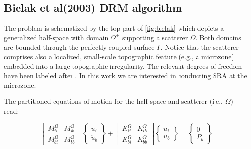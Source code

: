 \documentclass[12pt,letterpaper]{article}
\begin{document}
\subsection*{Bielak et al(2003) DRM algorithm}
The problem is schematized by the top part of \cref{fig:bielak} which depicts a generalized half-space with domain $\Omega^+$ supporting a scatterer $\Omega$. Both domains are bounded through the perfectly coupled surface $\Gamma$. Notice that the scatterer comprises also a localized, small-scale topographic feature (e.g., a microzone) embedded into a large topographic irregularity. The relevant degrees of freedom have been labeled after \cite{bielak2003}. In this work we are interested in conducting SRA at the microzone.


The partitioned equations of motion for the half-space and scatterer (i.e., $\Omega$) read;


\begin{equation}
\left[ {\begin{array}{*{20}{c}}
{M_{ii}^\Omega }&{M_{ib}^\Omega }\\
{M_{bi}^\Omega }&{M_{bb}^\Omega }
\end{array}} \right]\left\{ {\begin{array}{*{20}{c}}
{{{\ddot u}_i}}\\
{{{\ddot u}_b}}
\end{array}} \right\} + \left[ {\begin{array}{*{20}{c}}
{K_{ii}^\Omega }&{K_{ib}^\Omega }\\
{K_{bi}^\Omega }&{K_{bb}^\Omega }
\end{array}} \right]\left\{ {\begin{array}{*{20}{c}}
{{u_i}}\\
{{u_b}}
\end{array}} \right\} = \left\{ {\begin{array}{*{20}{c}}
0\\
{{P_b}}
\end{array}} \right\}
\label{scat}
\end{equation}
\end{document}
